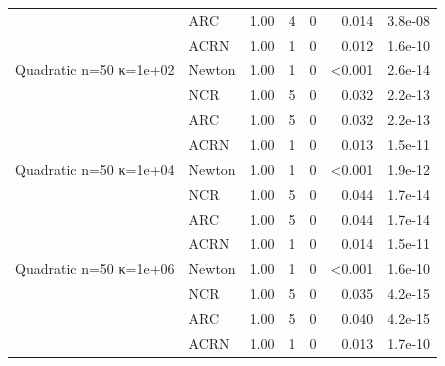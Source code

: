 \begin{table}[ht]
\begin{tabular}{|l|l|r|r|r|r|r|}
     & ARC & 1.00 & 4 & 0 & 0.014 & 3.8e-08 \\
     & ACRN & 1.00 & 1 & 0 & 0.012 & 1.6e-10 \\
    \hline
    Quadratic n=50 κ=1e+02 & Newton & 1.00 & 1 & 0 & <0.001 & 2.6e-14 \\
     & NCR & 1.00 & 5 & 0 & 0.032 & 2.2e-13 \\
     & ARC & 1.00 & 5 & 0 & 0.032 & 2.2e-13 \\
     & ACRN & 1.00 & 1 & 0 & 0.013 & 1.5e-11 \\
    \hline
    Quadratic n=50 κ=1e+04 & Newton & 1.00 & 1 & 0 & <0.001 & 1.9e-12 \\
     & NCR & 1.00 & 5 & 0 & 0.044 & 1.7e-14 \\
     & ARC & 1.00 & 5 & 0 & 0.044 & 1.7e-14 \\
     & ACRN & 1.00 & 1 & 0 & 0.014 & 1.5e-11 \\
    \hline
    Quadratic n=50 κ=1e+06 & Newton & 1.00 & 1 & 0 & <0.001 & 1.6e-10 \\
     & NCR & 1.00 & 5 & 0 & 0.035 & 4.2e-15 \\
     & ARC & 1.00 & 5 & 0 & 0.040 & 4.2e-15 \\
     & ACRN & 1.00 & 1 & 0 & 0.013 & 1.7e-10 \\
    \hline
  \end{tabular}
\end{table}